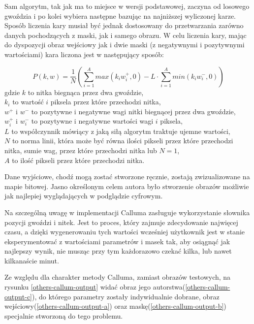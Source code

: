         Sam algorytm, tak jak ma to miejsce w wersji podstawowej, zaczyna od losowego gwoździa i po kolei wybiera następne bazując na najniższej wyliczonej karze. Sposób liczenia kary musiał być jednak dostosowany do przetwarzania zarówno danych pochodzących z maski, jak i samego obrazu. W celu liczenia kary, mając do dyspozycji obraz wejściowy jak i dwie maski (z negatywnymi i pozytywnymi wartościami) kara liczona jest w następujący sposób:
        
        \begin{equation} \label{others-callum-penalty}
            P(k, w) = \frac{1}{N} (\sum_{i=1}^A max(k_i w_i^+, 0) - L \cdot \sum_{i=1}^A min(k_i w_i^-, 0))
        \end{equation}
        gdzie \(k\) to nitka biegnąca przez dwa gwoździe,\\
        \(k_i\) to wartość \(i\) piksela przez które przechodzi nitka,\\
        \(w^+\) i \(w^-\) to pozytywne i negatywne wagi nitki biegnącej przez dwa gwoździe,\\
        \(w_i^+\) i \(w_i^-\) to pozytywne i negatywne wartości wagi \(i\) piksela,\\
        \(L\) to współczynnik mówiący z jaką siłą algorytm traktuje ujemne wartości,\\
        \(N\) to norma linii, która może być równa ilości pikseli przez które przechodzi nitka, sumie wag, przez które przechodzi nitka lub \(N = 1\),\\
        \(A\) to ilość pikseli przez które przechodzi nitka.
        
        Dane wyjściowe, chodź mogą zostać stworzone ręcznie, zostają zwizualizowane na mapie bitowej. Jasno określonym celem autora było stworzenie obrazów możliwie jak najlepiej wyglądających w podglądzie cyfrowym. 
        
        Na szczególną uwagę w implementacji Calluma zasługuje wykorzystanie słownika pozycji gwoździ i nitek. Jest to proces, który zajmuje zdecydowanie najwięcej czasu, a dzięki wygenerowaniu tych wartości wcześniej użytkownik jest w stanie eksperymentować z wartościami parametrów i masek tak, aby osiągnąć jak najlepszy wynik, nie musząc przy tym każdorazowo czekać kilka, lub nawet kilkanaście minut. 
        
        Ze względu dla charakter metody Calluma, zamiast obrazów testowych, na rysunku \ref{others-callum-output} widać obraz jego autorstwa(\ref{others-callum-output-c}), do którego parametry zostały indywidualnie dobrane, obraz wejściowy(\ref{others-callum-output-a}) oraz maskę(\ref{others-callum-output-b}) specjalnie stworzoną do tego problemu. 
        
